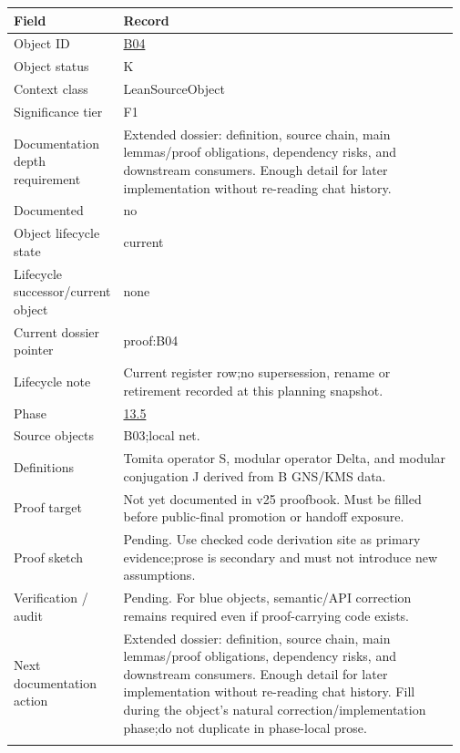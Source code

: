 \begin{longtable}{L{0.16\linewidth} L{0.81\linewidth}}
\hline
\textbf{Field} & \textbf{Record}\\
\hline
Object ID & \hyperlink{object-row-B04}{B04}\\
\hline\addlinespace[0.20em]
Object status & K\\
\hline\addlinespace[0.20em]
Context class & LeanSourceObject\\
\hline\addlinespace[0.20em]
Significance tier & F1\\
\hline\addlinespace[0.20em]
Documentation depth requirement & Extended dossier: definition, source chain, main lemmas/\allowbreak{}proof obligations, dependency risks, and downstream consumers. Enough detail for later implementation without re-reading chat history.\\
\hline\addlinespace[0.20em]
Documented & no\\
\hline\addlinespace[0.20em]
Object lifecycle state & current\\
\hline\addlinespace[0.20em]
Lifecycle successor/\allowbreak{}current object & none\\
\hline\addlinespace[0.20em]
Current dossier pointer & proof:B04\\
\hline\addlinespace[0.20em]
Lifecycle note & Current register row;\newline no supersession, rename or retirement recorded at this planning snapshot.\\
\hline\addlinespace[0.20em]
Phase & \hyperlink{phase-row-13-5}{13.5}\\
\hline\addlinespace[0.20em]
Source objects & B03;\newline local net.\\
\hline\addlinespace[0.20em]
Definitions & Tomita operator S, modular operator Delta, and modular conjugation J derived from B GNS/\allowbreak{}KMS data.\\
\hline\addlinespace[0.20em]
Proof target & Not yet documented in v25 proofbook. Must be filled before public-final promotion or handoff exposure.\\
\hline\addlinespace[0.20em]
Proof sketch & Pending. Use checked code derivation site as primary evidence;\newline prose is secondary and must not introduce new assumptions.\\
\hline\addlinespace[0.20em]
Verification /\allowbreak{} audit & Pending. For blue objects, semantic/\allowbreak{}API correction remains required even if proof-carrying code exists.\\
\hline\addlinespace[0.20em]
Next documentation action & Extended dossier: definition, source chain, main lemmas/\allowbreak{}proof obligations, dependency risks, and downstream consumers. Enough detail for later implementation without re-reading chat history. Fill during the object's natural correction/\allowbreak{}implementation phase;\newline do not duplicate in phase-local prose.\\
\hline\addlinespace[0.20em]
\end{longtable}
